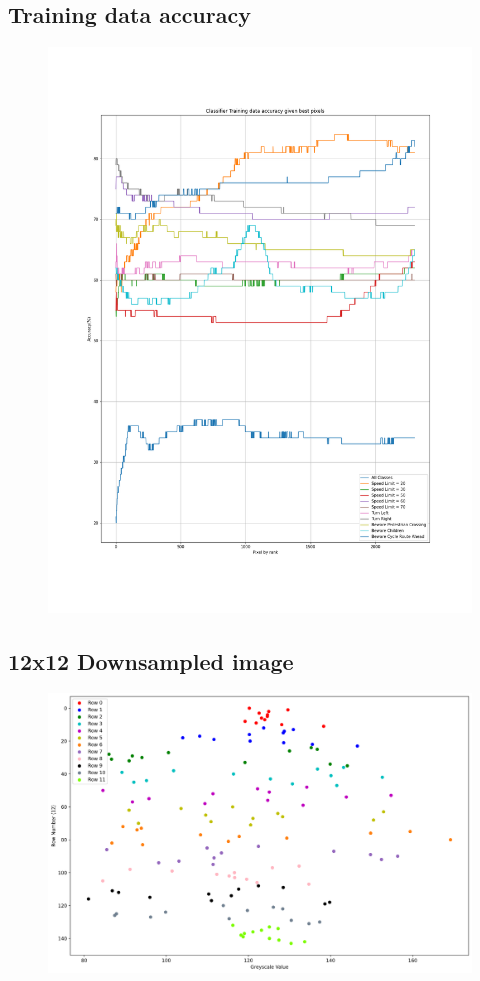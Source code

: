 \documentclass[11pt]{article}
\begin{document}
\begin{appendices}
\subsection{Training data accuracy}\label{train_2304}
\begin{figure}[h!]
  \centering
  \includegraphics[scale=0.4]{Images/train_2304_pixels.png}
\end{figure}

\newpage
\subsection{12x12 Downsampled image}\label{12x12Scatter}
\begin{figure}[h!]
  \centering
  \includegraphics[scale=0.4]{Images/12x12 Scatter.png}
\end{figure}

\end{appendices}
\end{document}
